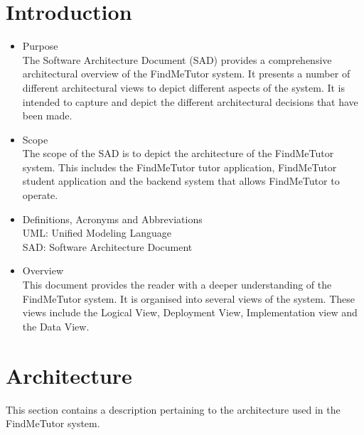 \documentclass[12pt]{article}
\begin{document}
\section{\textbf{Introduction}}
\begin{itemize}

\item Purpose\\
The Software Architecture Document (SAD) provides a comprehensive architectural overview of the FindMeTutor system. It presents a number of different architectural views to depict different aspects of the system. It is intended to capture and depict the different architectural decisions that have been made.

\item Scope\\
The scope of the SAD is to depict the architecture of the FindMeTutor system. This includes the FindMeTutor tutor application, FindMeTutor student application and the backend system that allows FindMeTutor to operate.

\item Definitions, Acronyms and Abbreviations\\
UML: Unified Modeling Language\\
SAD: Software Architecture Document

\item Overview\\
This document provides the reader with a deeper understanding of the FindMeTutor system. It is organised into several views of the system. These views include the Logical View, Deployment View, Implementation view and the Data View.


\end{itemize}

\pagebreak

\section{Architecture}
This section contains a description pertaining to the architecture used in the FindMeTutor system.
\end{document}
